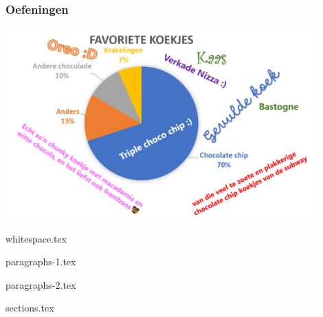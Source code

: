 \documentclass[allauthors,dutch]{../../cursuspresentatie}
\def\importslide#1#2{%
	{#2}
}
\begin{document}

\begin{frame}
	\frametitle{Oefeningen}
	
	\centering
	
	\includegraphics[width=0.9\textwidth,height=0.85\textheight,keepaspectratio]{images/cookie_art.png}
\end{frame}


\importslide{beginners_NL}{whitespace.tex}


\importslide{beginners_NL}{paragraphs-1.tex}

\importslide{beginners_NL}{paragraphs-2.tex}


\importslide{beginners_NL}{sections.tex}

\end{document}
